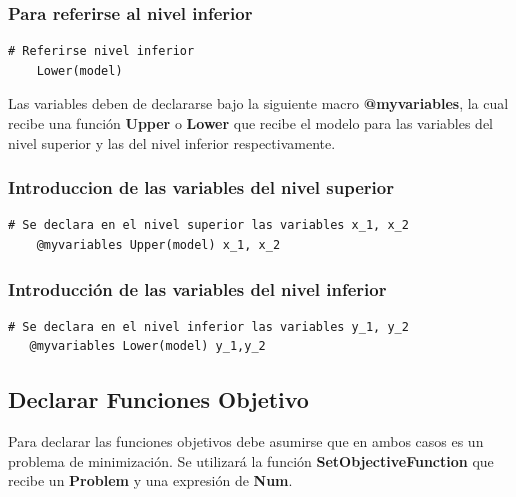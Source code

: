 \subsubsection{Para referirse al nivel inferior}
\begin{lstlisting}[caption={Referirse al nivel inferior}]
    # Referirse nivel inferior
    Lower(model)
\end{lstlisting}


Las variables deben de 
declararse bajo la siguiente macro \textbf{@myvariables}, la cual 
recibe una función \textbf{Upper} o \textbf{Lower} que recibe el modelo
para las variables del nivel superior y las del nivel inferior respectivamente.

\subsubsection{Introduccion de  las variables del nivel superior }

\begin{lstlisting}[caption={Introducir las variables del nivel superior}]
    # Se declara en el nivel superior las variables x_1, x_2
    @myvariables Upper(model) x_1, x_2
\end{lstlisting}

\subsubsection{Introducción de las variables del nivel inferior}

\begin{lstlisting}[caption={Introducir las variables del nivel inferior}]
   # Se declara en el nivel inferior las variables y_1, y_2
   @myvariables Lower(model) y_1,y_2
\end{lstlisting}


\subsection{Declarar Funciones Objetivo}

Para declarar las funciones objetivos debe asumirse que en ambos casos es un 
problema de minimización. Se utilizará la función \textbf{SetObjectiveFunction}
que recibe un \textbf{Problem} y una expresión de \textbf{Num}.

